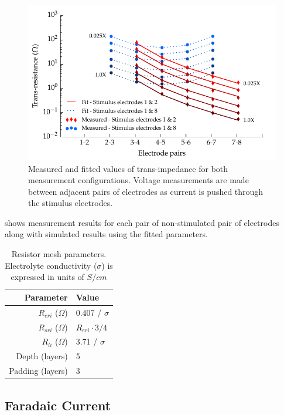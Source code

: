         \begin{figure}
          \centering
          \includegraphics{content/pt2/07-InterfaceModel/graphics/graph_transimpedance_pbs}
          \caption{\label{fig:pt2-graph_transimpedance_pbs}Measured and fitted values of trans-impedance for both measurement configurations. Voltage measurements are made between adjacent pairs of electrodes as current is pushed through the stimulus electrodes.}
        \end{figure}

         shows measurement results for each pair of non-stimulated pair of electrodes along with simulated results using the fitted parameters.


        \begin{table}
          \centering
          \begin{tabular}{r | l}
            Parameter & Value \\
            \hline
            $R_{eri}$ ($\Omega$)& 0.407 / $\sigma$\\
            $R_{sri}$ ($\Omega$)& $R_{eri}\cdot 3/4$\\
            $R_{li}$ ($\Omega$)& 3.71 / $\sigma$ \\
            Depth (layers) & 5 \\
            Padding (layers) & 3 \\
          \end{tabular}
          \caption{\label{tab:RESparams}Resistor mesh parameters. Electrolyte conductivity ($\sigma$) is expressed in units of $S / cm$}
        \end{table}

    \subsection{Faradaic Current}

